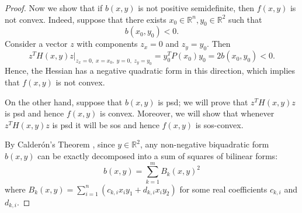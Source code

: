 \documentclass[12pt]{elsarticle}
\theoremstyle{definition}
\begin{document}
\begin{proof}
Now we show that if $b(x,y)$ is not positive semidefinite, then $f(x,y)$ is not convex. 
Indeed, suppose that there exists $x_0\in\mathbb{R}^n, y_0\in\mathbb{R}^2$ such that
\[
b(x_0,y_0) < 0 .
\]
Consider a vector $z$ with components $z_x=0$ and $z_y=y_0$. Then
\[
z^T H(x,y) z 
\bigg|_{z_x=0,\; x=x_0,\; y=0,\; z_y=y_0}
= y_0^T P(x_0) y_0
= 2b(x_0,y_0) < 0 .
\]
Hence, the Hessian has a negative quadratic form in this direction, which implies that $f(x,y)$ is not convex.

On the other hand, suppose that $b(x,y)$ is psd; we will prove that $z^T H(x,y) z$ is psd and hence $f(x,y)$ is convex. Moreover, we will show that whenever $z^T H(x,y) z$ is psd it will be sos and hence $f(x,y)$ is sos-convex.

By Calder\'{o}n's Theorem \cite{calderon1973note}, since $y \in \mathbb{R}^2$, any non-negative biquadratic form $b(x,y)$ can be exactly decomposed into a sum of squares of bilinear forms:
\begin{equation}
    b(x,y) = \sum_{k=1}^m B_k(x,y)^2
\end{equation}
where $B_k(x,y) = \sum_{i=1}^n (c_{k,i} x_i y_1 + d_{k,i} x_i y_2)$ for some real coefficients $c_{k,i}$ and $d_{k,i}$.


\end{proof}
\end{document}
